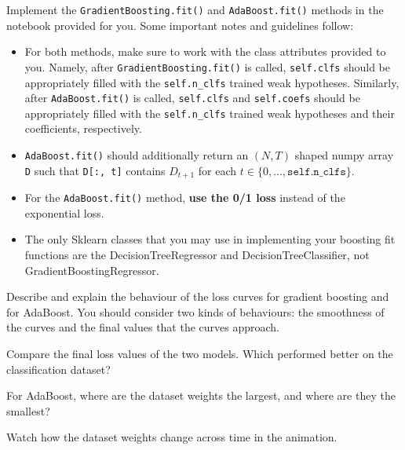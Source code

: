 \begin{problem}[14]
    Implement the \texttt{GradientBoosting.fit()} and \texttt{AdaBoost.fit()} methods in the notebook provided for you. Some important notes and guidelines follow:
    \begin{itemize}
        \item For both methods, make sure to work with the class attributes provided to you. Namely, after \texttt{GradientBoosting.fit()} is called, \texttt{self.clfs} should be appropriately filled with the \texttt{self.n_clfs} trained weak hypotheses. Similarly, after \texttt{AdaBoost.fit()} is called, \texttt{self.clfs} and \texttt{self.coefs} should be appropriately filled with the \texttt{self.n_clfs} trained weak hypotheses and their coefficients, respectively.
        \item \texttt{AdaBoost.fit()} should additionally return an $(N, T)$ shaped numpy array \texttt{D} such that \texttt{D[:, t]} contains $D_{t+1}$ for each $t \in \{0, \ldots, \texttt{self.n_clfs}\}$.
        \item For the \texttt{AdaBoost.fit()} method, \textbf{use the 0/1 loss} instead of the exponential loss.
	\item The only Sklearn classes that you may use in implementing your boosting fit functions are the DecisionTreeRegressor and DecisionTreeClassifier, not GradientBoostingRegressor.
    \end{itemize}
\end{problem}

\begin{problem}[2]
    Describe and explain the behaviour of the loss curves for gradient boosting and for AdaBoost. You should consider two kinds of behaviours: the smoothness of the curves and the final values that the curves approach.
\end{problem}

\begin{problem}[2]
    Compare the final loss values of the two models. Which performed better on the classification dataset?
\end{problem}

\begin{problem}[2]
    For AdaBoost, where are the dataset weights the largest, and where are they the smallest?
\end{problem}
\begin{hint}
    Watch how the dataset weights change across time in the animation.
\end{hint}

